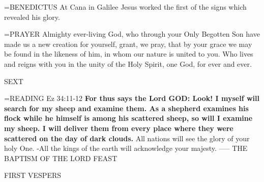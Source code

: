 \hangindent=\parindent \small{BENEDICTUS 	At Cana in Galilee Jesus worked the first of the signs which revealed his glory.\\}

\hangindent=\parindent \small{PRAYER 	Almighty ever-living God, who through your Only Begotten Son have made us a new creation for yourself, grant, we pray, that by your grace we may be found in the likeness of him, in whom our nature is united to you. Who lives and reigns with you in the unity of the Holy Spirit, one God, for ever and ever.}

\begin{flushleft}\normalsize SEXT\\\end{flushleft}
\hangindent=\parindent \small{READING}   Ez 34:11-12 \textbf{  For thus says the Lord GOD: Look! I myself will search for my sheep and examine them. As a shepherd examines his flock while he himself is among his scattered sheep, so will I examine my sheep. I will deliver them from every place where they were scattered on the day of dark clouds.}
All nations will see the glory of your holy One.
-All the kings of the earth will acknowledge your majesty.
-----
THE BAPTISM OF THE LORD
FEAST

\begin{flushleft}\normalsize FIRST VESPERS\\\end{flushleft}

